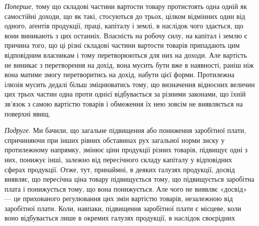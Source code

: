 \emph{Поперше}, тому що складові частини вартости товару протистоять одна
одній як самостійні доходи, що як такі, стосуються до трьох, цілком відмінних
один від одного, аґентів продукції, праці, капіталу і землі, в наслідок
чого здається, що вони виникають з цих останніх. Власність на робочу силу, на
капітал і землю є причина того, що ці різні складові частини вартости товарів
припадають цим відповідним власникам і тому перетворюються для них на доходи.
Але вартість не виникає з перетворення на дохід, вона мусить бути вже в наявності,
раніш ніж вона матиме змогу перетворитись на дохід, набути цієї
форми. Протилежна ілюзія мусить дедалі більш зміцнюватись тому, що визначення
відносних величин цих трьох частин одна проти однієї відбувається за
різними законами, що їхній зв’язок з самою вартістю товарів і обмеження їх
нею зовсім не виявляється на поверхні явищ.

\emph{Подруге}. Ми бачили, що загальне підвищення або пониження заробітної
плати, спричиняючи при інших рівних обставинах рух загальної норми
зиску у протилежному напрямку, змінює ціни продукції різних товарів, підвищує
одні з них, понижує інші, залежно від пересічного складу капіталу у відповідних
сферах продукції. Отже, тут, принаймні, в деяких галузях продукції,
досвід виявляє, що пересічна ціна товару підвищується тому, що підвищується
заробітна плата і понижується тому, що вона понижується. Але чого не виявляє
«досвід» — це прихованого регулювання цих змін вартістю товарів, незалежною
від заробітної плати. Коли, навпаки, підвищення заробітної плати є місцеве, коли
воно відбувається лише в окремих галузях продукції, в наслідок своєрідних
\parbreak{}  %
